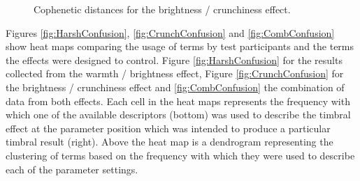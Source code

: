 			\begin{figure}[h!]
				\centering
				\quad
				\caption{Cophenetic distances for the brightness / crunchiness effect.}
				\label{fig:CrunchCophs}
			\end{figure}

			Figures \ref{fig:HarshConfusion}, \ref{fig:CrunchConfusion} and \ref{fig:CombConfusion} show heat
			maps comparing the usage of terms by test participants and the terms the effects were designed to
			control. Figure \ref{fig:HarshConfusion} for the results collected from the warmth / brightness
			effect, Figure \ref{fig:CrunchConfusion} for the brightness / crunchiness effect and
			\ref{fig:CombConfusion} the combination of data from both effects. Each cell in the heat maps
			represents the frequency with which one of the available descriptors (bottom) was used to describe
			the timbral effect at the parameter position which was intended to produce a particular timbral
			result (right). Above the heat map is a dendrogram representing the clustering of terms based on
			the frequency with which they were used to describe each of the parameter settings.

